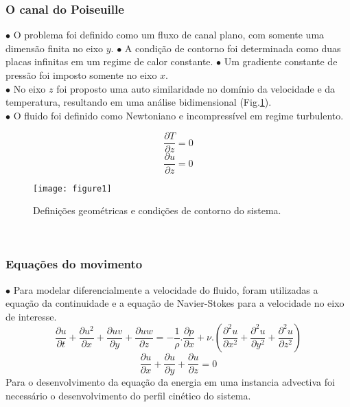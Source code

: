 \documentclass[xcolor=dvipsnames,10pt,aspectratio=169]{beamer}
\begin{document}
		\begin{frame}
			\frametitle{O canal do Poiseuille}
			$\bullet$ O problema foi definido como um fluxo de canal plano, com somente uma dimensão finita no eixo $y$. 
			$\bullet$ A condição de contorno foi determinada como duas placas infinitas em um regime de calor constante.
			$\bullet$ Um gradiente constante de pressão foi imposto somente no eixo $x$.\\
			$\bullet$ No eixo $z$ foi proposto uma auto similaridade no domínio da velocidade e da temperatura, resultando em uma análise bidimensional (Fig.\ref{figure.1}). \\
			$\bullet$ O fluido foi definido como Newtoniano e incompressível em regime turbulento.\\
			\begin{minipage}[h!]{0.2\textwidth}
				\begin{equation*}
				 \frac{\partial T }{\partial z} = 0
				\end{equation*}
				\begin{equation*}
				\frac{\partial u }{\partial z} = 0
				\end{equation*}
			\end{minipage}\hfill
			\begin{minipage}[h!]{0.75\textwidth}
			\begin{figure}[h!]
				\centering
				\texttt{[image: figure1]}
				\caption{Definições geométricas e condições de contorno do sistema.}
				\label{figure.1}
			\end{figure}
			\end{minipage}
			\\
		\end{frame}
	
	
	
	
	
		\begin{frame}
			\frametitle{Equações do movimento}
		$\bullet$ Para modelar diferencialmente a velocidade do fluido, foram utilizadas a equação da continuidade e a equação de Navier-Stokes para a velocidade no eixo de interesse.
		\begin{equation}
		\frac{\partial u}{\partial t} + \frac{\partial u^2}{\partial x} + \frac{\partial uv}{\partial y} + \frac{\partial uw}{\partial z} = - \frac{1}{\rho} . \frac{\partial {p}}{\partial x} + \nu . \left( \frac{\partial^2 u}{\partial x^2} + \frac{\partial^2 u}{\partial y^2} + \frac{\partial^2 u}{\partial z^2}   \right)
		\end{equation}
		\begin{equation}
		\frac{\partial u}{\partial x} + \frac{\partial u}{\partial y} + \frac{\partial u}{\partial z} = 0
		\end{equation}
		Para o desenvolvimento da equação da energia em uma instancia advectiva foi necessário o desenvolvimento do perfil cinético do sistema.
		\end{frame}
	
\end{document}
